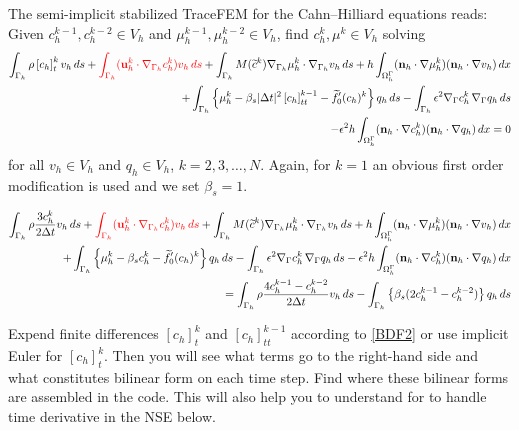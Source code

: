 \documentclass{article}
\newcommand{\bn}{\mathbf n}
\newcommand{\bu}{\mathbf u}
\newcommand{\gradG}{\nabla_{\Gamma}}
\newcommand{\OGamma}{\Omega^\Gamma_h}
\begin{document}
The semi-implicit stabilized TraceFEM for the Cahn--Hilliard equations
reads: Given $c^{k-1}_h,c^{k-2}_h\in V_h$ and $\mu^{k-1}_h,\mu^{k-2}_h\in V_h$,  find $c_h^k, \mu^k \in V_h$ solving
\begin{equation}\label{eq:CH_FE}
\begin{split}
\int_{\Gamma_h} \rho \left[c_h\right]_t^{k}v_h\,ds    + {\color{red}  \int_{\Gamma_h} (\bu_h^k\cdot\nabla_{\Gamma_h}c_h^k )v_h\,ds }+ \int_{\Gamma_h} M(\widetilde c^k) \nabla_{\Gamma_h}\mu_h^k\cdot\nabla_{\Gamma_h}v_h\,ds +  h \int_{\OGamma} (\bn_h\cdot\nabla \mu_h^k) (\bn_h\cdot\nabla v_h) \, dx\\
%
+\int_{\Gamma_h}\left\{  \mu_h^k - \beta_s|\Delta t|^2\left[{c}_h\right]_{tt}^{k-1} - \widetilde  f'_0( c_h)^{k}\right\}q_h\,ds
- \int_{\Gamma_h} \epsilon^2 \gradG c_h^k \, \gradG q_h \, ds \\ -\epsilon^2 h \int_{\OGamma} ( \bn_h\cdot\nabla c_h^k) (\bn_h\cdot\nabla q_h) \, dx = 0
\end{split}
\end{equation}
for all  $v_h\in V_h$ and $q_h \in V_h$, $k=2,3,\dots,N$. Again, for $k=1$ an obvious first order modification is used and we set $\beta_s=1$.

\begin{equation}\label{eq:CH_FE}
	\begin{split}
		\int_{\Gamma_h} \rho \frac{3c_h^k}{2\Delta t}v_h\,ds    + {\color{red}  \int_{\Gamma_h} (\bu_h^k\cdot\nabla_{\Gamma_h}c_h^k )v_h\,ds }+ \int_{\Gamma_h} M(\widetilde c^k) \nabla_{\Gamma_h}\mu_h^k\cdot\nabla_{\Gamma_h}v_h\,ds +  h \int_{\OGamma} (\bn_h\cdot\nabla \mu_h^k) (\bn_h\cdot\nabla v_h) \, dx\\
		+\int_{\Gamma_h}\left\{  \mu_h^k - \beta_s c_h^k - \widetilde  f'_0( c_h)^{k}\right\}q_h\,ds
		- \int_{\Gamma_h} \epsilon^2 \gradG c_h^k \, \gradG q_h \, ds  -\epsilon^2 h \int_{\OGamma} ( \bn_h\cdot\nabla c_h^k) (\bn_h\cdot\nabla q_h) \, dx \\= \int_{\Gamma_h} \rho \frac{4c_h^{k-1}-c_h^{k-2}}{2\Delta t}v_h\,ds - \int_{\Gamma_h}\left\{\beta_s(2c_h^{k-1}-c_h^{k-2})\right\}q_h\,ds
	\end{split}
\end{equation}

{\color{blue} Expend finite differences $[c_h]_t^{k}$ and $\left[{c}_h\right]_{tt}^{k-1}$ according to \eqref{BDF2} or use implicit Euler for $[c_h]_t^{k}$. Then you will see what terms go to the right-hand side and what constitutes bilinear form on each time step. Find where these bilinear forms are assembled in the code.
This will also  help you to understand for to handle time derivative in the NSE below.}
\end{document}
